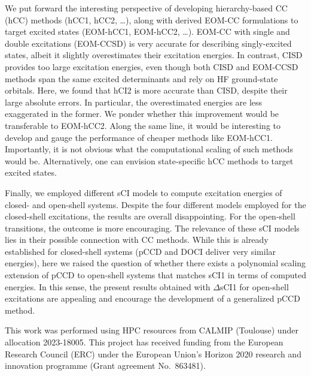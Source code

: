 \documentclass[aip,jcp,reprint,noshowkeys,superscriptaddress]{revtex4-1}
\begin{document}
We put forward the interesting perspective of developing hierarchy-based CC (hCC) methods (hCC1, hCC2, \ldots),
along with derived EOM-CC formulations to target excited states (EOM-hCC1, EOM-hCC2, \ldots).
EOM-CC with single and double excitations (EOM-CCSD) \cite{Rowe_1968,Monkhorst_1977,Koch_1990,Stanton_1993}
is very accurate for describing singly-excited states, \cite{Loos_2018,Loos_2020,Loos_2020a} albeit it slightly overestimates their excitation energies.
In contrast, CISD provides too large excitation energies, \cite{Koch_1990,Kossoski_2023}
even though both CISD and EOM-CCSD methods span the same excited determinants and rely on HF ground-state orbitals.
Here, we found that hCI2 is more accurate than CISD, despite their large absolute errors. In particular, the overestimated energies are less exaggerated in the former.
We ponder whether this improvement would be transferable to EOM-hCC2.
Along the same line, it would be interesting to develop and gauge the performance of cheaper methods like EOM-hCC1.
Importantly, it is not obvious what the computational scaling of such methods would be.
Alternatively, one can envision state-specific hCC methods to target excited states.

Finally, we employed different sCI models to compute excitation energies of closed- and open-shell systems.
Despite the four different models employed for the closed-shell excitations, the results are overall disappointing.
For the open-shell transitions, the outcome is more encouraging.
The relevance of these sCI models lies in their possible connection with CC methods.
While this is already established for closed-shell systems (pCCD and DOCI deliver very similar energies), \cite{Bytautas_2011,Allen_1962,Smith_1965,Veillard_1967,Kossoski_2021,Marie_2021}
here we raised the question of whether there exists a polynomial scaling extension of pCCD to open-shell systems that matches sCI1 in terms of computed energies.
In this sense, the present results obtained with $\Delta$sCI1 for open-shell excitations are appealing and encourage the development of a generalized pCCD method.

\begin{acknowledgements}
This work was performed using HPC resources from CALMIP (Toulouse) under allocation 2023-18005.
This project has received funding from the European Research Council (ERC) under the European Union's Horizon 2020 research and innovation programme (Grant agreement No.~863481).
\end{acknowledgements}
\end{document}
